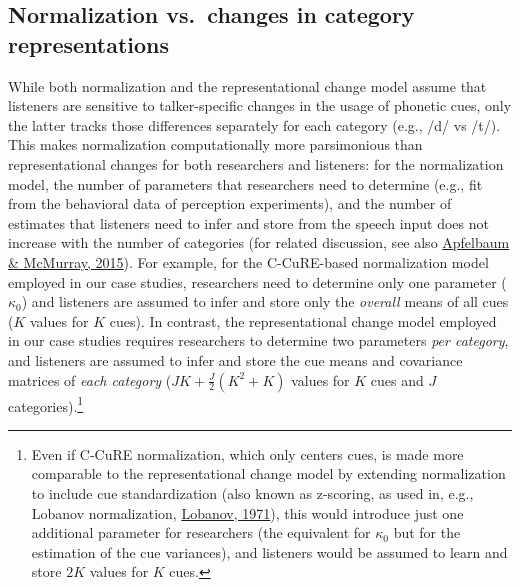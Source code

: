 \documentclass[
  11pt,
  english,
  man,floatsintext]{apa6}
\begin{document}
\hypertarget{normalization-vs.-changes-in-category-representations}{%
\subsection{Normalization vs.~changes in category representations}\label{normalization-vs.-changes-in-category-representations}}

While both normalization and the representational change model assume that listeners are sensitive to talker-specific changes in the usage of phonetic cues, only the latter tracks those differences separately for each category (e.g., /d/ vs /t/). This makes normalization computationally more parsimonious than representational changes for both researchers and listeners: for the normalization model, the number of parameters that researchers need to determine (e.g., fit from the behavioral data of perception experiments), and the number of estimates that listeners need to infer and store from the speech input does not increase with the number of categories (for related discussion, see also \protect\hyperlink{ref-apfelbaum-mcmurray2015}{Apfelbaum \& McMurray, 2015}). For example, for the C-CuRE-based normalization model employed in our case studies, researchers need to determine only one parameter (\(\kappa_0\)) and listeners are assumed to infer and store only the \emph{overall} means of all cues (\(K\) values for \(K\) cues). In contrast, the representational change model employed in our case studies requires researchers to determine two parameters \emph{per category}, and listeners are assumed to infer and store the cue means and covariance matrices of \emph{each category} (\(JK + \frac{J}{2}(K^2+K)\) values for \(K\) cues and \(J\) categories).\footnote{Even if C-CuRE normalization, which only centers cues, is made more comparable to the representational change model by extending normalization to include cue standardization (also known as z-scoring, as used in, e.g., Lobanov normalization, \protect\hyperlink{ref-lobanov1971}{Lobanov, 1971}), this would introduce just one additional parameter for researchers (the equivalent for \(\kappa_0\) but for the estimation of the cue variances), and listeners would be assumed to learn and store \(2K\) values for \(K\) cues.}
\end{document}
